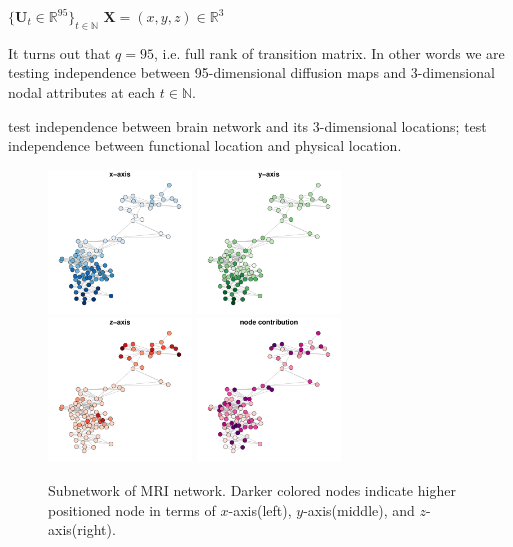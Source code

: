 \documentclass[12pt]{article}
\theoremstyle{definition}
\begin{document}
$\{ \mathbf{U}_{t} \in \mathbb{R}^{95} \}_{t \in \mathbb{N}}$ $\mathbf{X} = (x,y,z) \in \mathbb{R}^{3}$
	
It turns out that $q=95$, i.e. full rank of transition matrix. In other words we are testing independence between 95-dimensional diffusion maps and 3-dimensional nodal attributes at each $t \in \mathbb{N}$.
	
	
test independence between brain network and its 3-dimensional locations; test independence between functional location and physical location. 
	
\begin{figure}[H]
	\centering
		\includegraphics[width=1.5in]{../Figure/brain1_x.pdf}
		\includegraphics[width=1.5in]{../Figure/brain1_y.pdf}
		\includegraphics[width=1.5in]{../Figure/brain1_z.pdf}
		\includegraphics[width=1.5in]{../Figure/brain1_weight.pdf}
	\caption{Subnetwork of MRI network. Darker colored nodes indicate higher positioned node in terms of $x$-axis(left), $y$-axis(middle), and $z$-axis(right).}
		\label{fig:mri}
\end{figure}
	
\end{document}
